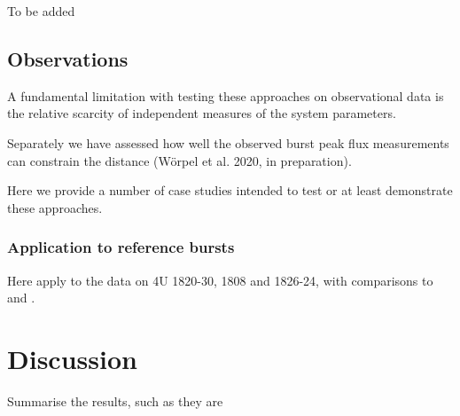 \documentclass{aastex63}
\begin{document}
To be added

\subsection{Observations} 

A fundamental limitation with testing these approaches on observational data is the relative scarcity of independent measures of the system parameters. 

Separately we have assessed how well the observed burst peak flux measurements can constrain the distance (W\"orpel et al. 2020, in preparation).

Here we provide a number of case studies intended to test or at least demonstrate these approaches.

\subsubsection{Application to reference bursts}

Here apply to the data on 4U 1820-30, 1808 and 1826-24, with comparisons to \cite{goodwin19c} and \cite{johnston20}.

\section{Discussion}

Summarise the results, such as they are

\acknowledgments



%

\vspace{5mm}

\end{document}
